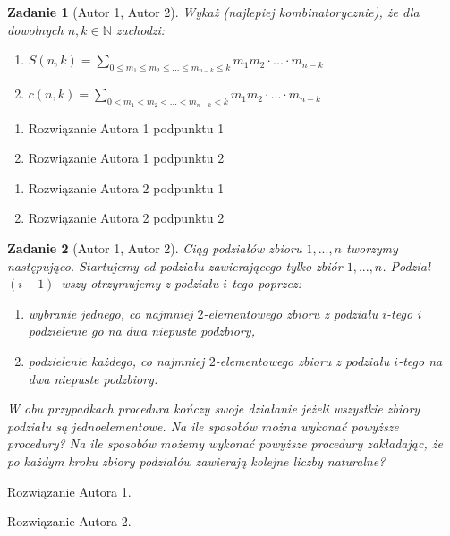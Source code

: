\documentclass{mwart}
\newtheorem{zad}{Zadanie}[section]
\begin{document}
\begin{zad}[Autor 1, Autor 2]
    Wykaż (najlepiej kombinatorycznie), że dla dowolnych $n, k \in \mathbb{N}$
    zachodzi:
    \begin{enumerate}
        \item $S(n, k) = \sum_{0 \leq m_1 \leq m_2 \leq ... \leq m_{n-k} \leq k} m_1m_2 \cdot ... \cdot m_{n-k}$
        \item $c(n, k) = \sum_{0 < m_1 < m_2 < ... < m_{n-k} < k} m_1m_2 \cdot ... \cdot m_{n-k}$
    \end{enumerate}
\end{zad}
\begin{mdframed}
    \begin{enumerate}
        \item Rozwiązanie Autora 1 podpunktu 1
        \item Rozwiązanie Autora 1 podpunktu 2
    \end{enumerate}
\end{mdframed}
\begin{mdframed}
    \begin{enumerate}
        \item Rozwiązanie Autora 2 podpunktu 1
        \item Rozwiązanie Autora 2 podpunktu 2
    \end{enumerate}
\end{mdframed}


\begin{zad}[Autor 1, Autor 2]
    Ciąg podziałów zbioru ${1, ..., n}$ tworzymy następująco. Startujemy
    od podziału zawierającego tylko zbiór ${1, ..., n}$. Podział $(i + 1)$--wszy
    otrzymujemy z podziału $i$-tego poprzez:
    \begin{enumerate}
        \item wybranie jednego, co najmniej $2$-elementowego zbioru z podziału $i$-tego i podzielenie
              go na dwa niepuste podzbiory,
        \item podzielenie każdego, co najmniej $2$-elementowego zbioru z podziału $i$-tego na dwa
              niepuste podzbiory.
    \end{enumerate}
    W obu przypadkach procedura kończy swoje działanie jeżeli wszystkie zbiory podziału są
    jednoelementowe. Na ile sposobów można wykonać powyższe procedury? Na ile sposobów
    możemy wykonać powyższe procedury zakładając, że po każdym kroku zbiory podziałów
    zawierają kolejne liczby naturalne?
\end{zad}
\begin{mdframed}
    Rozwiązanie Autora 1.
\end{mdframed}
\begin{mdframed}
    Rozwiązanie Autora 2.
\end{mdframed}
\end{document}
